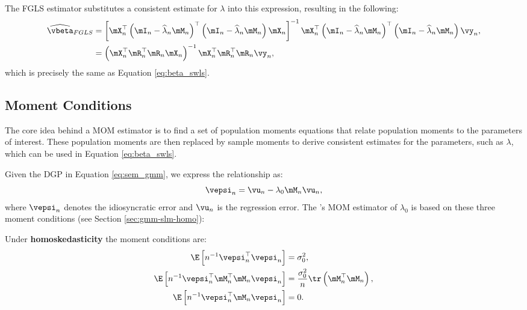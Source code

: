 The FGLS estimator substitutes a consistent estimate for $\lambda$ into this expression, resulting in the following:
\begin{equation*}
\begin{aligned}
  \widehat{\vbeta}_{FGLS} & =\left[\mX^\top_n\left(\mI_n - \widehat{\lambda}_n\mM_n\right)^\top\left(\mI_n - \widehat{\lambda}_n\mM_n\right)\mX_n\right]^{-1}\mX^\top_n\left(\mI_n - \widehat{\lambda}_n\mM_n\right)^\top\left(\mI_n - \widehat{\lambda}_n\mM_n\right)\vy_n, \\
  & = \left(\mX_n^\top \mR_{n}^\top\mR_{n}\mX_n\right)^{-1} \mX_n^\top \mR_{n}^\top\mR_{n}\vy_n,
  \end{aligned}
\end{equation*}
%
which is precisely the same as Equation \eqref{eq:beta_swls}.

\subsection{Moment Conditions}\label{section:Moment_Condtions}

The core idea behind a MOM estimator is to find a set of population moments equations that relate population moments to the parameters of interest. These population moments are then replaced by sample moments to derive consistent estimates for the parameters, such as $\lambda$, which can be used in Equation \eqref{eq:beta_swls}.

Given the DGP in Equation \eqref{eq:sem_gmm}, we express the relationship as: 
\begin{equation*}
  \vepsi_n = \vu_n - \lambda_0\mM_n\vu_n,
\end{equation*}
%
where $\vepsi_n$ denotes the idiosyncratic error and $\vu_n$ is the regression error. The \cite{kelejian1999generalized}'s MOM estimator of $\lambda_0$ is based on these three moment conditions  (see Section \ref{sec:gmm-slm-homo}):

\begin{definition}\label{def:moment-conditions-homo}
Under \textbf{homoskedasticity} \citep{kelejian1999generalized} the moment conditions are:
\begin{equation*}
  \begin{aligned}
  \E\left[n^{-1}\vepsi^\top_n \vepsi_n\right] &= \sigma^2_0, \\
   \E\left[n^{-1}\vepsi^\top_n\mM_n^\top\mM_n\vepsi_n\right] &= \frac{\sigma^2_0}{n}\tr\left(\mM^\top_n\mM_n\right),\\
   \E\left[n^{-1}\vepsi^\top_n \mM_n \vepsi_n \right] & =  0.
  \end{aligned}
\end{equation*}
\end{definition}

